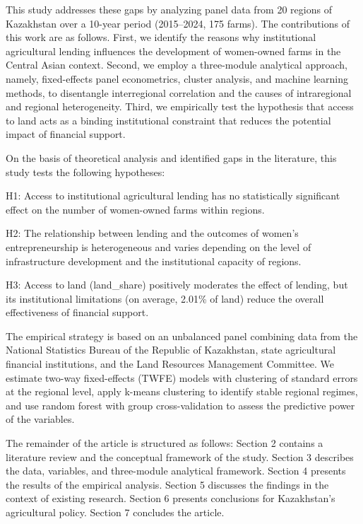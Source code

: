 ﻿\documentclass[pdflatex,sn-mathphys-ay]{sn-jnl}
\begin{document}
This study addresses these gaps by analyzing panel data from 20 regions of Kazakhstan over a 10-year period (2015--2024, 175 farms). The contributions of this work are as follows. First, we identify the reasons why institutional agricultural lending influences the development of women-owned farms in the Central Asian context. Second, we employ a three-module analytical approach, namely, fixed-effects panel econometrics, cluster analysis, and machine learning methods, to disentangle interregional correlation and the causes of intraregional and regional heterogeneity. Third, we empirically test the hypothesis that access to land acts as a binding institutional constraint that reduces the potential impact of financial support.

On the basis of theoretical analysis and identified gaps in the literature, this study tests the following hypotheses:

H1: Access to institutional agricultural lending has no statistically significant effect on the number of women-owned farms within regions.

H2: The relationship between lending and the outcomes of women's entrepreneurship is heterogeneous and varies depending on the level of infrastructure development and the institutional capacity of regions.

H3: Access to land (land\_share) positively moderates the effect of lending, but its institutional limitations (on average, 2.01\% of land) reduce the overall effectiveness of financial support.

The empirical strategy is based on an unbalanced panel combining data from the National Statistics Bureau of the Republic of Kazakhstan, state agricultural financial institutions, and the Land Resources Management Committee. We estimate two-way fixed-effects (TWFE) models with clustering of standard errors at the regional level, apply k-means clustering to identify stable regional regimes, and use random forest with group cross-validation to assess the predictive power of the variables.

The remainder of the article is structured as follows: Section 2 contains a literature review and the conceptual framework of the study. Section 3 describes the data, variables, and three-module analytical framework. Section 4 presents the results of the empirical analysis. Section 5 discusses the findings in the context of existing research. Section 6 presents conclusions for Kazakhstan's agricultural policy. Section 7 concludes the article.
\end{document}
